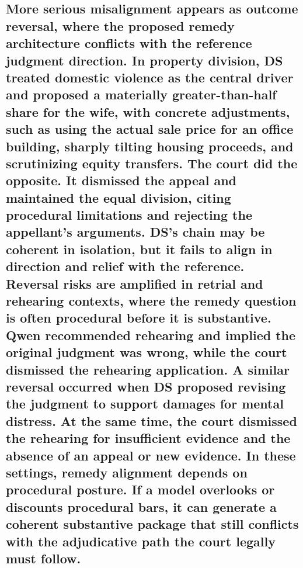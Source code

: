 {{{{{{{{{{{{{{{{\subsection{More serious misalignment appears as outcome reversal, where the proposed remedy architecture conflicts with the reference judgment direction. In property division, DS treated domestic violence as the central driver and proposed a materially greater-than-half share for the wife, with concrete adjustments, such as using the actual sale price for an office building, sharply tilting housing proceeds, and scrutinizing equity transfers. The court did the opposite. It dismissed the appeal and maintained the equal division, citing procedural limitations and rejecting the appellant's arguments. DS's chain may be coherent in isolation, but it fails to align in direction and relief with the reference. Reversal risks are amplified in retrial and rehearing contexts, where the remedy question is often procedural before it is substantive. Qwen recommended rehearing and implied the original judgment was wrong, while the court dismissed the rehearing application. A similar reversal occurred when DS proposed revising the judgment to support damages for mental distress. At the same time, the court dismissed the rehearing for insufficient evidence and the absence of an appeal or new evidence. In these settings, remedy alignment depends on procedural posture. If a model overlooks or discounts procedural bars, it can generate a coherent substantive package that still conflicts with the adjudicative path the court legally must follow.}\label{more-serious-misalignment-appears-as-outcome-reversal-where-the-proposed-remedy-architecture-conflicts-with-the-reference-judgment-direction.-in-property-division-ds-treated-domestic-violence-as-the-central-driver-and-proposed-a-materially-greater-than-half-share-for-the-wife-with-concrete-adjustments-such-as-using-the-actual-sale-price-for-an-office-building-sharply-tilting-housing-proceeds-and-scrutinizing-equity-transfers.-the-court-did-the-opposite.-it-dismissed-the-appeal-and-maintained-the-equal-division-citing-procedural-limitations-and-rejecting-the-appellants-arguments.-dss-chain-may-be-coherent-in-isolation-but-it-fails-to-align-in-direction-and-relief-with-the-reference.-reversal-risks-are-amplified-in-retrial-and-rehearing-contexts-where-the-remedy-question-is-often-procedural-before-it-is-substantive.-qwen-recommended-rehearing-and-implied-the-original-judgment-was-wrong-while-the-court-dismissed-the-rehearing-application.-a-similar-reversal-occurred-when-ds-proposed-revising-the-judgment-to-support-damages-for-mental-distress.-at-the-same-time-the-court-dismissed-the-rehearing-for-insufficient-evidence-and-the-absence-of-an-appeal-or-new-evidence.-in-these-settings-remedy-alignment-depends-on-procedural-posture.-if-a-model-overlooks-or-discounts-procedural-bars-it-can-generate-a-coherent-substantive-package-that-still-conflicts-with-the-adjudicative-path-the-court-legally-must-follow.}

}}}}}}}}}}}}}}}}
